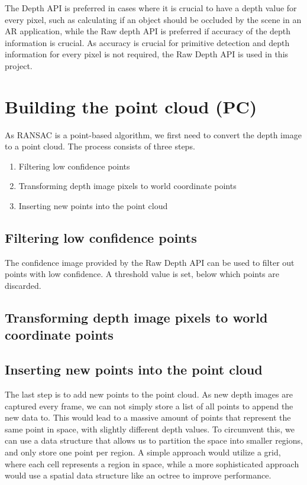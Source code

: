 

The Depth API is preferred in cases where it is crucial to have a depth value for every pixel, such as calculating if an object should be occluded by the scene in an AR application,
while the Raw depth API is preferred if accuracy of the depth information is crucial. \parencite{google_llc_arcore_doc}
As accuracy is crucial for primitive detection and depth information for every pixel is not required, the Raw Depth API is used in this project.

\section{Building the point cloud (PC)}
As RANSAC is a point-based algorithm, we first need to convert the depth image to a point cloud.
The process consists of three steps.
\begin{enumerate}
    \item Filtering low confidence points
    \item Transforming depth image pixels to world coordinate points
    \item Inserting new points into the point cloud
\end{enumerate}

\subsection{Filtering low confidence points}
The confidence image provided by the Raw Depth API can be used to filter out points with low confidence.
A threshold value is set, below which points are discarded.

\subsection{Transforming depth image pixels to world coordinate points}

\subsection{Inserting new points into the point cloud}

The last step is to add new points to the point cloud.
As new depth images are captured every frame, we can not simply store a list of all points to append the new data to.
This would lead to a massive amount of points that represent the same point in space, with slightly different depth values.
To circumvent this, we can use a data structure that allows us to partition the space into smaller regions, and only store one point per region.
A simple approach would utilize a grid, where each cell represents a region in space, while a more sophisticated approach
would use a spatial data structure like an octree to improve performance.

